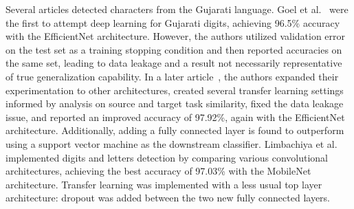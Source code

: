 \documentclass[english,twoside,openright]{UH_DS_MSc}
\begin{document}
Several articles detected characters from the Gujarati language.
Goel et al.~\cite{10goelGujarati} were the first to attempt deep learning for Gujarati digits, 
achieving 96.5\% accuracy with the EfficientNet architecture. However, the authors utilized 
validation error on the test set as a training stopping condition and then reported accuracies 
on the same set, leading to data leakage and a result not necessarily representative of true
generalization capability. In a later article~\cite{8goelGujarati2023}, the authors expanded 
their experimentation to other architectures, created several transfer learning settings informed 
by analysis on source and target task similarity, fixed the data leakage issue, and reported an 
improved accuracy of 97.92\%, again with the EfficientNet architecture. Additionally, adding a fully
connected layer is found to outperform using a support vector machine as the downstream classifier.
Limbachiya et al.~\cite{2limbachiyaGujarati} implemented digits and letters detection by comparing various convolutional architectures,
 achieving the best accuracy of 97.03\% with the MobileNet architecture. Transfer learning was implemented with a
  less usual top layer architecture: dropout was added between the two new fully connected layers.


\end{document}
